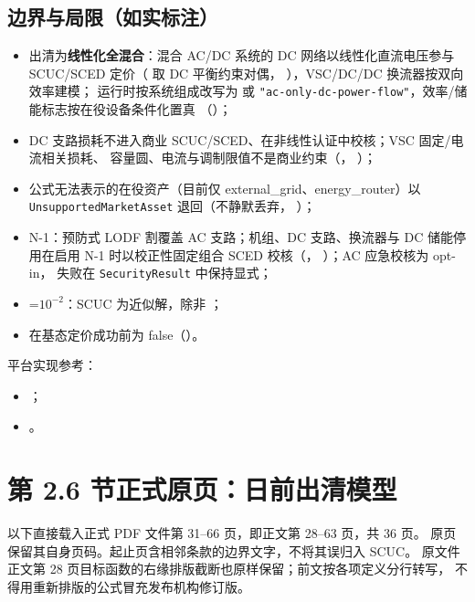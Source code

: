 \documentclass[UTF8,fontset=fandol,a4paper,11pt]{ctexart}
\begin{document}
\subsection{边界与局限（如实标注）}
\begin{itemize}
  \item 出清为\textbf{线性化全混合}：混合 AC/DC 系统的 DC 网络以线性化直流电压参与
        SCUC/SCED 定价（ 取 DC 平衡约束对偶，
        ），VSC/DC/DC 换流器按双向效率建模；
         运行时按系统组成改写为
         或
        \texttt{"ac-only-dc-power-flow"}，效率/储能标志按在役设备条件化置真
        （）；
  \item DC 支路损耗不进入商业 SCUC/SCED、在非线性认证中校核；VSC 固定/电流相关损耗、
        容量圆、电流与调制限值不是商业约束（，
        ）；
  \item 公式无法表示的在役资产（目前仅 external\_grid、energy\_router）以
        \texttt{Unsupported\allowbreak Market\allowbreak Asset} 退回（不静默丢弃，
        ）；
  \item N-1：预防式 LODF 割覆盖 AC 支路；机组、DC 支路、换流器与 DC 储能停用在启用
        N-1 时以校正性固定组合 SCED 校核（，
        ）；AC 应急校核为 opt-in，
        失败在 \texttt{SecurityResult} 中保持显式；
  \item {}=$10^{-2}$：SCUC 为近似解，除非 ；
  \item {} 在基态定价成功前为 false（）。
\end{itemize}
平台实现参考：
\begin{itemize}
 \item {}；
 \item {}。
\end{itemize}


\appendix
\section{第 2.6 节正式原页：日前出清模型}\label{sec:southern-facsimile}
以下直接载入正式 PDF 文件第 31--66 页，即正文第 28--63 页，共 36 页。
原页保留其自身页码。起止页含相邻条款的边界文字，不将其误归入 SCUC。
原文件正文第 28 页目标函数的右缘排版截断也原样保留；前文按各项定义分行转写，
不得用重新排版的公式冒充发布机构修订版。

\end{document}
